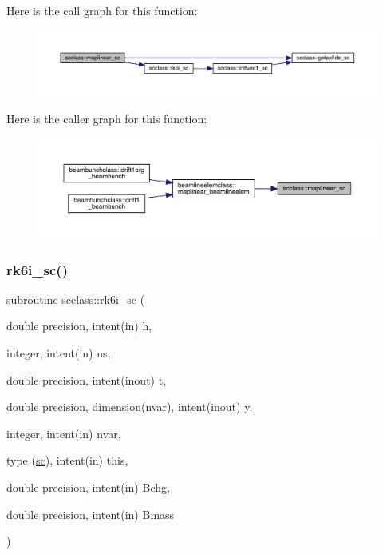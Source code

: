 Here is the call graph for this function\+:\nopagebreak
\begin{figure}[H]
\begin{center}
\leavevmode
\includegraphics[width=350pt]{namespacescclass_aec786348c1a0beec0d090c12b13d588c_cgraph}
\end{center}
\end{figure}
Here is the caller graph for this function\+:\nopagebreak
\begin{figure}[H]
\begin{center}
\leavevmode
\includegraphics[width=350pt]{namespacescclass_aec786348c1a0beec0d090c12b13d588c_icgraph}
\end{center}
\end{figure}
\mbox{\label{namespacescclass_a4b16987e1d3852123c69a6bfc0cec75a}} 
\subsubsection{\texorpdfstring{rk6i\_sc()}{rk6i\_sc()}}
{\footnotesize\ttfamily subroutine scclass\+::rk6i\+\_\+sc (\begin{DoxyParamCaption}\item[{double precision, intent(in)}]{h,  }\item[{integer, intent(in)}]{ns,  }\item[{double precision, intent(inout)}]{t,  }\item[{double precision, dimension(nvar), intent(inout)}]{y,  }\item[{integer, intent(in)}]{nvar,  }\item[{type (\mbox{\hyperlink{namespacescclass_structscclass_1_1sc}{sc}}), intent(in)}]{this,  }\item[{double precision, intent(in)}]{Bchg,  }\item[{double precision, intent(in)}]{Bmass }\end{DoxyParamCaption})}

